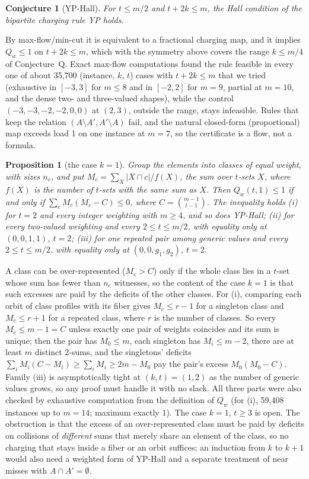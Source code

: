 \documentclass[11pt]{article}
\theoremstyle{plain}
\newtheorem*{proposition*}{Proposition}
\newtheorem*{conjecture*}{Conjecture}
\begin{document}
\begin{conjecture*}[YP-Hall]
For $t \le m/2$ and $t + 2k \le m$, the Hall condition of the bipartite charging rule YP holds.
\end{conjecture*}
By max-flow/min-cut it is equivalent to a fractional charging map, and it implies $Q_w \le 1$ on $t + 2k \le m$, which with the symmetry above covers the range $k \le m/4$ of Conjecture~Q. Exact max-flow computations found the rule feasible in every one of about 35,700 (instance, $k$, $t$) cases with $t + 2k \le m$ that we tried (exhaustive in $[-3,3]$ for $m \le 8$ and in $[-2,2]$ for $m = 9$, partial at $m = 10$, and the dense two- and three-valued shapes), while the control $(-3,-3,-2,-2,0,0)$ at $(2,3)$, outside the range, stays infeasible. Rules that keep the relation $(A \setminus A', A' \setminus A)$ fail, and the natural closed-form (proportional) map exceeds load 1 on one instance at $m = 7$, so the certificate is a flow, not a formula.

\begin{proposition*}[the case $k = 1$]
Group the elements into classes of equal weight, with sizes $n_c$, and put $M_c = \sum_X |X \cap c|/f(X)$, the sum over $t$-sets $X$, where $f(X)$ is the number of $t$-sets with the same sum as $X$. Then $Q_w(t,1) \le 1$ if and only if $\sum_c M_c (M_c - C) \le 0$, where $C = \binom{m-1}{t-1}$. The inequality holds
(i) for $t = 2$ and every integer weighting with $m \ge 4$, and so does YP-Hall;
(ii) for every two-valued weighting and every $2 \le t \le m/2$, with equality only at $(0,0,1,1)$, $t = 2$;
(iii) for one repeated pair among generic values and every $2 \le t \le m/2$, with equality only at $(0,0,g_1,g_2)$, $t = 2$.
\end{proposition*}
A class can be over-represented ($M_c > C$) only if the whole class lies in a $t$-set whose sum has fewer than $n_c$ witnesses, so the content of the case $k = 1$ is that such excesses are paid by the deficits of the other classes. For (i), comparing each orbit of class profiles with its fiber gives $M_c \le r - 1$ for a singleton class and $M_c \le r + 1$ for a repeated class, where $r$ is the number of classes. So every $M_c \le m - 1 = C$ unless exactly one pair of weights coincides and its sum is unique; then the pair has $M_0 \le m$, each singleton has $M_i \le m - 2$, there are at least $m$ distinct 2-sums, and the singletons' deficits $\sum_i M_i (C - M_i) \ge \sum_i M_i \ge 2m - M_0$ pay the pair's excess $M_0(M_0 - C)$. Family (iii) is asymptotically tight at $(k,t) = (1,2)$ as the number of generic values grows, so any proof must handle it with no slack. All three parts were also checked by exhaustive computation from the definition of $Q_w$ (for (i), 59,408 instances up to $m = 14$; maximum exactly 1). The case $k = 1$, $t \ge 3$ is open. The obstruction is that the excess of an over-represented class must be paid by deficits on collisions of \emph{different} sums that merely share an element of the class, so no charging that stays inside a fiber or an orbit suffices; an induction from $k$ to $k + 1$ would also need a weighted form of YP-Hall and a separate treatment of near misses with $A \cap A' = \emptyset$.
\end{document}
